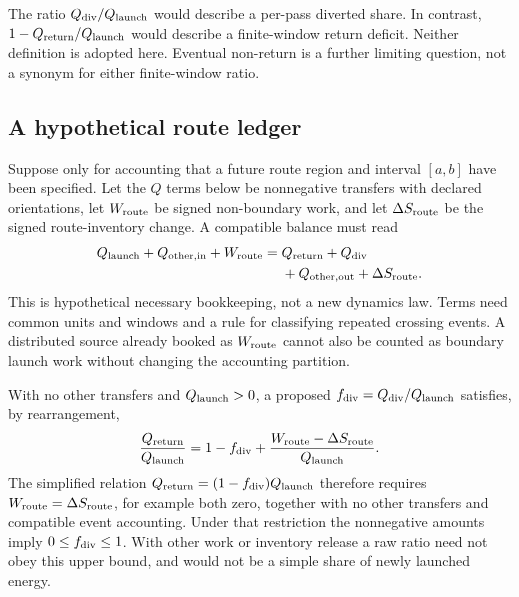 The ratio $Q_{\rm div}/Q_{\rm launch}$ would describe a per-pass diverted share. In contrast, $1-Q_{\rm return}/Q_{\rm launch}$ would describe a finite-window return deficit. Neither definition is adopted here. Eventual non-return is a further limiting question, not a synonym for either finite-window ratio.

\subsection{A hypothetical route ledger}\label{sec:ledger}
Suppose only for accounting that a future route region and interval $[a,b]$ have been specified. Let the $Q$ terms below be nonnegative transfers with declared orientations, let $W_{\rm route}$ be signed non-boundary work, and let $\Delta S_{\rm route}$ be the signed route-inventory change. A compatible balance must read
\begin{equation}\label{eq:route}
\begin{split}
 Q_{\rm launch}+Q_{\rm other,in}+W_{\rm route}
 ={}&Q_{\rm return}+Q_{\rm div}\\
 &+Q_{\rm other,out}+\Delta S_{\rm route}.
\end{split}
\end{equation}
This is hypothetical necessary bookkeeping, not a new dynamics law. Terms need common units and windows and a rule for classifying repeated crossing events. A distributed source already booked as $W_{\rm route}$ cannot also be counted as boundary launch work without changing the accounting partition.

With no other transfers and $Q_{\rm launch}>0$, a proposed $f_{\rm div}=Q_{\rm div}/Q_{\rm launch}$ satisfies, by rearrangement,
\begin{equation}\label{eq:returnratio}
 \frac{Q_{\rm return}}{Q_{\rm launch}}
 =1-f_{\rm div}
  +\frac{W_{\rm route}-\Delta S_{\rm route}}{Q_{\rm launch}}.
\end{equation}
The simplified relation $Q_{\rm return}=(1-f_{\rm div})Q_{\rm launch}$ therefore requires $W_{\rm route}=\Delta S_{\rm route}$, for example both zero, together with no other transfers and compatible event accounting. Under that restriction the nonnegative amounts imply $0\le f_{\rm div}\le1$. With other work or inventory release a raw ratio need not obey this upper bound, and would not be a simple share of newly launched energy.

